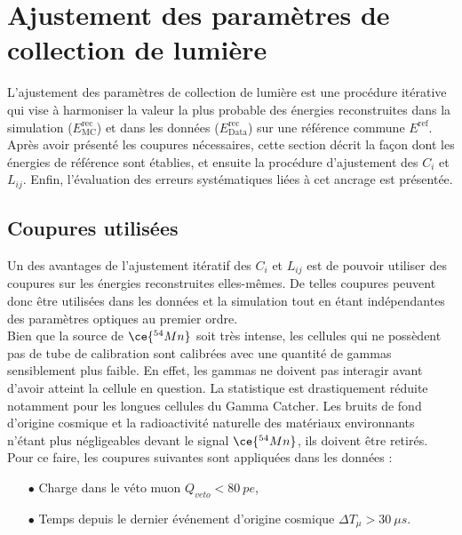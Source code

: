 \section{Ajustement des paramètres de collection de lumière}

L'ajustement des paramètres de collection de lumière est une procédure itérative qui vise à harmoniser la valeur la plus probable des énergies reconstruites dans la simulation ($E^{\textrm{rec}}_{\textrm{MC}}$) et dans les données ($E^{\textrm{rec}}_{\textrm{Data}}$) sur une référence commune $E^{\textrm{ref}}$. Après avoir présenté les coupures nécessaires, cette section décrit la façon dont les énergies de référence sont établies, et ensuite la procédure d'ajustement des $C_i$ et $L_{ij}$. Enfin, l'évaluation des erreurs systématiques liées à cet ancrage est présentée.

\subsection{Coupures utilisées}
\label{sec:cuts_for_Erec_tuning}

Un des avantages de l'ajustement itératif des $C_i$ et $L_{ij}$ est de pouvoir utiliser des coupures sur les énergies reconstruites elles-mêmes. De telles coupures peuvent donc être utilisées dans les données et la simulation tout en étant indépendantes des paramètres optiques au premier ordre.\\

Bien que la source de $\ce{^{54}Mn}$ soit très intense, les cellules qui ne possèdent pas de tube de calibration sont calibrées avec une quantité de gammas sensiblement plus faible. En effet, les gammas ne doivent pas  interagir avant d'avoir atteint la cellule en question. La statistique est drastiquement réduite notamment pour les longues cellules du Gamma Catcher. Les bruits de fond d'origine cosmique et la radioactivité naturelle des matériaux environnants n'étant plus négligeables devant le signal $\ce{^{54}Mn}$, ils doivent être retirés. Pour ce faire, les coupures suivantes sont appliquées dans les données :

\begin{itemize}
    \item[$\bullet$] Charge dans le véto muon $Q_{veto} < \SI{80}{pe}$,
    \item[$\bullet$] Temps depuis le dernier événement d'origine cosmique $\Delta T_\mu > \SI{30}{\mu s}$.
\end{itemize}

